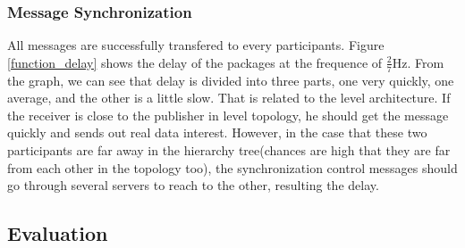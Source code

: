 \documentclass[conference]{IEEEtran}
\begin{document}
\subsubsection{Message Synchronization} All messages are successfully transfered to every participants. Figure \ref{function_delay} shows the delay of the packages at the frequence of $\frac{2}{7}$Hz. From the graph, we can see that delay is divided into three parts, one very quickly, one average, and the other is a little slow. That is related to the level architecture. If the receiver is close to the publisher in level topology, he should get the message quickly and sends out real data interest. However, in the case that these two participants are far away in the hierarchy tree(chances are high that they are far from each other in the topology too), the synchronization control messages should go through several servers to reach to the other, resulting the delay.

\subsection{Evaluation}
\end{document}
